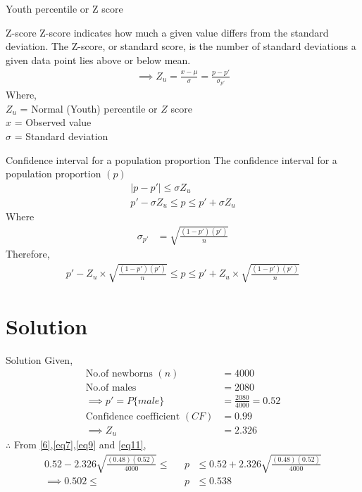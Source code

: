 \documentclass{beamer}
\begin{document}
\begin{frame}{Youth percentile or Z score}
    \begin{block}{Z-score}
       Z-score indicates how much a given value differs from the
    standard deviation. The Z-score, or standard score, is the number of standard deviations a given data point lies above or below mean.
    \begin{align}
        \implies Z_u = \frac{x-\mu}{\sigma} = \frac{p-p'}{\sigma_{p'}}
    \end{align}
     Where,\\
        $Z_u$ = Normal (Youth) percentile or $Z$ score\\
        $ x $ = Observed value\\
        $\sigma $ = Standard deviation
        
    \end{block}
\end{frame}
\begin{frame}{}
     \begin{block}{Confidence interval for a population proportion}
        The confidence interval for a population proportion $(p)$
        \begin{align}
        | p-p' | \leq \sigma Z_u\\
        p'-\sigma Z_u \leq p \leq p'+\sigma Z_u
        \end{align}
        Where
        \begin{align}
            \sigma_{p'} &= \sqrt{\frac{(1-p')(p')}{n}}
        \end{align}
    Therefore,
        \begin{align}
           p' - Z_u \times \sqrt{\frac{(1-p')(p')}{n}} \leq p \leq p' + Z_u \times \sqrt{\frac{(1-p')(p')}{n}}\label{6}
        \end{align}
    \end{block}
\end{frame}
\section{Solution}
\begin{frame}{Solution}
    Given,\\
    \begin{align}
        \text{No.of newborns } (n) &= 4000 \label{eq7}\\
        \text{No.of males } &= 2080\\
        \implies p'=P\{male\} &=\frac{2080}{4000}=0.52\label{eq9}\\
        \text{Confidence coefficient }(CF) &= 0.99\\
        \implies Z_u &=2.326 \label{eq11}
    \end{align}
$\therefore$ From \eqref{6},\eqref{eq7},\eqref{eq9} and \eqref{eq11},
\begin{align}
    0.52 -2.326\sqrt{\frac{(0.48)(0.52)}{4000}} \leq\text{ } &p \text{ } \leq 0.52 +2.326\sqrt{\frac{(0.48)(0.52)}{4000}}\\
    \implies 0.502 \leq \text{ } &p \text{ } \leq 0.538
\end{align}
    
\end{frame}
\end{document}
